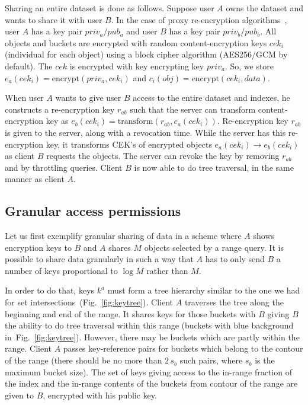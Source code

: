\documentclass[notitlepage,longbibliography]{revtex4-1}
\newcommand{\figref}[1]{Fig.~\ref{#1}}
\begin{document}
Sharing an entire dataset is done as follows.
Suppose user $A$ owns the dataset and wants to share it with user $B$.
In the case of proxy re-encryption algorithms~\cite{afgh,libert2011unidirectional}, user $A$ has a key pair $priv_a/pub_a$ and user $B$ has a key pair $priv_b/pub_b$.
All objects and buckets are encrypted with random content-encryption keys $cek_i$ (individual for each object) using a block cipher algorithm (AES256/GCM by default).
The $cek$ is encrypted with key encrypting key $priv_a$.
So, we store $e_a(cek_i) = \mbox{encrypt}(priv_a, cek_i)$ and $c_i(obj) = \mbox{encrypt}(cek_i, data)$.

When user $A$ wants to give user $B$ access to the entire dataset and indexes, he constructs a re-encryption key $r_{ab}$ such that
the server can transform content-encryption key as $e_b(cek_i) = \mbox{transform}(r_{ab}, e_a(cek_i))$.
Re-encryption key $r_{ab}$ is given to the server, along with a revocation time.
While the server has this re-encryption key, it transforms CEK's of encrypted objects $e_a(cek_i) \rightarrow e_b(cek_i)$ as client $B$ requests the objects.
The server can revoke the key by removing $r_{ab}$ and by throttling queries.
Client $B$ is now able to do tree traversal, in the same manner as client $A$.

\subsection{Granular access permissions}

Let us first exemplify granular sharing of data in a scheme where $A$ shows encryption keys to $B$ and $A$ shares $M$ objects selected by a range query.
It is possible to share data granularly in such a way that $A$ has to only send $B$ a number of keys proportional to $\log{M}$ rather than $M$.

In order to do that, keys $k^a$ must form a tree hierarchy similar to the one we had for set intersections~(\figref{fig:keytree}).
Client $A$ traverses the tree along the beginning and end of the range.
It shares keys for those buckets with $B$ giving $B$ the ability to do tree traversal within this range (buckets with blue background in~\figref{fig:keytree}).
However, there may be buckets which are partly within the range.
Client $A$ passes key-reference pairs for buckets which belong to the contour of the range (there should be no more than $2\,s_b$ such pairs, where $s_b$ is the maximum bucket size).
The set of keys giving access to the in-range fraction of the index and the in-range contents of the buckets from contour of the range are given to $B$, encrypted with his public key.
\end{document}
